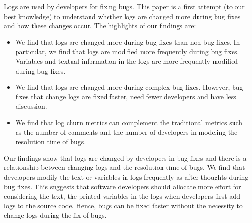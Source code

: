 Logs are used by developers for fixing bugs. This paper is a first attempt (to our best knowledge) to understand whether logs are changed more during bug fixes and how these changes occur. The highlights of our findings are:

\begin{itemize}
	\item We find that logs are changed more during bug fixes than non-bug fixes. In particular, we find that logs are modified more frequently during bug fixes. Variables and textual information in the logs are more frequently modified during bug fixes. 
	\item We find that logs are changed more during complex bug fixes. However, bug fixes that change logs are fixed faster, need fewer developers and have less discussion.
	\item We find that log churn metrics can complement the traditional metrics such as the number of comments and the number of developers in modeling the resolution time of bugs.
\end{itemize} 

Our findings show that logs are changed by developers in bug fixes and there is a relationship between changing logs and the resolution time of bugs. We find that developers modify the text or variables in logs frequently as after-thoughts during bug fixes. This suggests that software developers should allocate more effort for considering the text, the printed variables in the logs when developers first add logs to the source code. Hence, bugs can be fixed faster without the necessity to change logs during the fix of bugs. 
